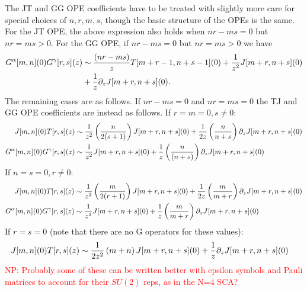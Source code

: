 \documentclass[../main.tex]{subfiles}
\begin{document}
The JT and GG OPE coefficients have to be treated with slightly more care for special choices of $n, r, m, s$, though the basic structure of the OPEs is the same.
For the JT OPE, the above expression also holds when $nr - ms = 0$ but $nr = m s >0$. 
For the GG OPE, if $n r - ms = 0$ but $nr = ms > 0$ we have
\begin{align}
G^{\alpha}[m, n](0)G^{\gamma}[r, s](z) &\sim {(nr-ms) \over z}T[m + r -1, n + s -1](0) + {1 \over z^2}J[m + r, n + s](0) \\ \nonumber
&+{1 \over z}\partial_z J[m + r, n+s](0).
\end{align}
The remaining cases are as follows. If $nr-ms = 0$ and $n r = ms = 0$ the TJ and GG OPE coefficients are instead as follows. \newline
If $r = m = 0, s \neq 0$:
\begin{align}
J[m, n](0)T[r, s](z) &\sim {1 \over z^2}\left({n \over 2(s + 1)}\right)J[m + r, n + s](0) +{1 \over 2 z}\left({n \over n + s} \right)\partial_z J[m + r, n + s](0) \\ \nonumber
G^{\alpha}[m, n](0)G^{\gamma}[r, s](z) &\sim {1 \over z^2}J[m + r, n + s](0) +{1 \over z}\left({n \over  (n + s)}\right)\partial_z J[m + r, n+s](0)
\end{align}
If $n = s = 0, r \neq 0$:
\begin{align}
J[m, n](0)T[r, s](z) &\sim {1 \over z^2}\left({m \over 2(r + 1)}\right)J[m + r, n + s](0) +{1 \over 2 z}\left({m \over m + r} \right)\partial_z J[m + r, n + s](0)\\
G^{\alpha}[m, n](0)G^{\gamma}[r, s](z) &\sim {1 \over z^2}J[m + r, n + s](0) +{1 \over z}\left({m \over m + r}\right)\partial_z J[m + r, n+s](0)
\end{align}
If $r = s= 0$ (note that there are no G operators for these values):
\begin{align}
J[m, n](0)T[r, s](z) &\sim {1 \over 2 z^2}\left(m + n\right)J[m + r, n + s](0) +{1 \over  z}\partial_z J[m + r, n + s](0)
\end{align}
\textcolor{red}{NP: Probably some of these can be written better with epsilon symbols and Pauli matrices to account for their $SU(2)$ reps, as in the N=4 SCA?}
\end{document}
